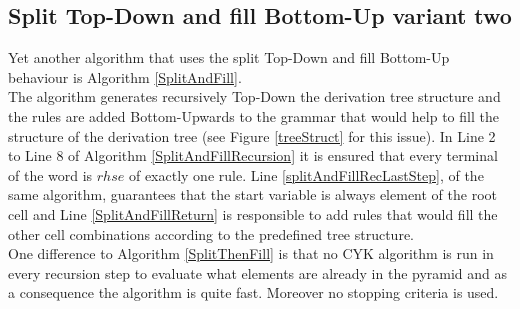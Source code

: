 \begin{testexample}
\begin{minipage}{6in}
{
			}
			
		\end{minipage}
		\label{IllustrationAlgorithmSplitThenFillPart6}
\end{testexample}

\clearpage

\subsection{Split Top-Down and fill Bottom-Up variant two}


\noindent Yet another algorithm that uses the split Top-Down and fill Bottom-Up behaviour is Algorithm \ref{SplitAndFill}.\\
The algorithm generates recursively Top-Down the derivation tree structure and the rules are added Bottom-Upwards to the grammar that would help to fill the structure of the derivation tree (see Figure \ref{treeStruct} for this issue). In Line 2 to Line 8 of Algorithm \ref{SplitAndFillRecursion} it is ensured that every terminal of the word is $rhse$ of exactly one rule. Line \ref{splitAndFillRecLastStep}, of the same algorithm, guarantees that the start variable is always element of the root cell and Line \ref{SplitAndFillReturn} is responsible to add rules that would fill the other cell combinations according to the predefined tree structure. \\
One difference to Algorithm \ref{SplitThenFill} is that no CYK algorithm is run in every recursion step to evaluate what elements are already in the pyramid and as a consequence the algorithm is quite fast. Moreover no stopping criteria is used. \\


